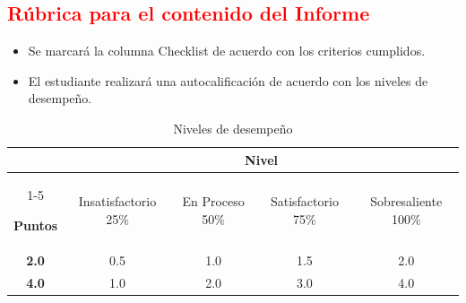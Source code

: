 \documentclass{article}
\begin{document}

\subsection{\textcolor{red}{Rúbrica para el contenido del Informe}}

\begin{itemize}

    \item Se marcará la columna Checklist de acuerdo con los
    criterios cumplidos.

    \item El estudiante realizará una autocalificación de acuerdo
    con los niveles de desempeño.

\end{itemize}

\begin{table}[H]

\caption{Niveles de desempeño}

\begin{center}

\begin{tabular}{ccccc}

\hline

&
\multicolumn{4}{c}{Nivel}

\\

\cline{1-5}

\textbf{Puntos}
&
Insatisfactorio 25\%
&
En Proceso 50\%
&
Satisfactorio 75\%
&
Sobresaliente 100\%

\\

\hline

\textbf{2.0}
&
0.5
&
1.0
&
1.5
&
2.0

\\

\textbf{4.0}
&
1.0
&
2.0
&
3.0
&
4.0

\\

\hline

\end{tabular}

\end{center}

\end{table}

\end{document}

